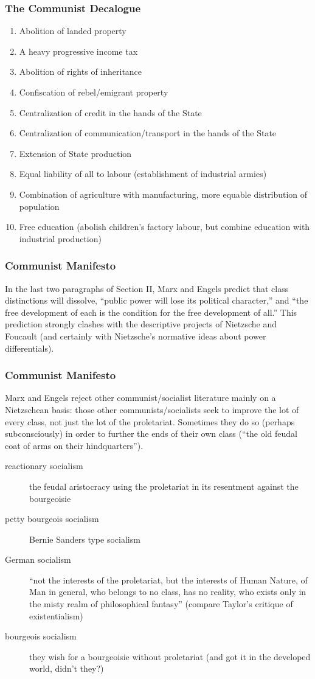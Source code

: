 \documentclass[xcolor=dvipsnames]{beamer}
\begin{document}
\begin{frame}
  \frametitle{The Communist Decalogue}
  \begin{enumerate}
  \item Abolition of landed property
  \item A heavy progressive income tax
  \item Abolition of rights of inheritance
  \item Confiscation of rebel/emigrant property
  \item Centralization of credit in the hands of the State
  \item Centralization of communication/transport in the hands of the
    State
  \item Extension of State production
  \item Equal liability of all to labour (establishment of industrial
    armies)
  \item Combination of agriculture with manufacturing, more equable
    distribution of population
  \item Free education (abolish children's factory labour, but combine
    education with industrial production)
  \end{enumerate}
\end{frame}

\begin{frame}
  \frametitle{Communist Manifesto}
  In the last two paragraphs of Section II, Marx and Engels predict
  that class distinctions will dissolve, ``public power will lose its
  political character,'' and ``the free development of each is the
  condition for the free development of all.'' This prediction
  strongly clashes with the descriptive projects of Nietzsche and
  Foucault (and certainly with Nietzsche's normative ideas about power
  differentials).
\end{frame}

\begin{frame}
  \frametitle{Communist Manifesto}
  Marx and Engels reject other communist/socialist literature mainly
  on a Nietzschean basis: those other communists/socialists seek to
  improve the lot of every class, not just the lot of the proletariat.
  Sometimes they do so (perhaps subconsciously) in order to further
  the ends of their own class (``the old feudal coat of arms on their
  hindquarters'').
  \begin{description}
  \item[reactionary socialism] the feudal aristocracy using the
    proletariat in its resentment against the bourgeoisie
  \item[petty bourgeois socialism] Bernie Sanders type socialism
  \item[German socialism] ``not the interests of the proletariat, but
    the interests of Human Nature, of Man in general, who belongs to
    no class, has no reality, who exists only in the misty realm of
    philosophical fantasy'' (compare Taylor's critique of
    existentialism)
  \item[bourgeois socialism] they wish for a bourgeoisie without
    proletariat (and got it in the developed world, didn't they?)
  \end{description}
\end{frame}
\end{document}

